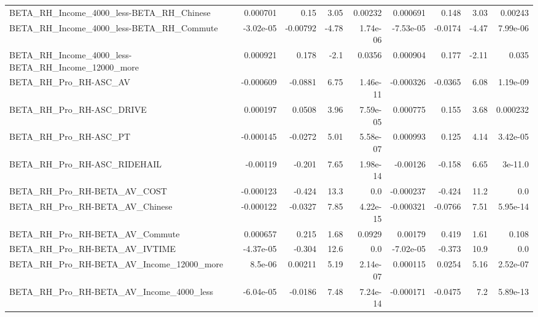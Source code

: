 \begin{tabular}{lrrrrrrrr}
BETA\_RH\_Income\_4000\_less-BETA\_RH\_Chinese           &    0.000701 &         0.15 &      3.05 &  0.00232 &   0.000691 &       0.148 &         3.03 &       0.00243 \\
BETA\_RH\_Income\_4000\_less-BETA\_RH\_Commute           &   -3.02e-05 &     -0.00792 &     -4.78 & 1.74e-06 &  -7.53e-05 &     -0.0174 &        -4.47 &      7.99e-06 \\
BETA\_RH\_Income\_4000\_less-BETA\_RH\_Income\_12000\_more &    0.000921 &        0.178 &      -2.1 &   0.0356 &   0.000904 &       0.177 &        -2.11 &         0.035 \\
BETA\_RH\_Pro\_RH-ASC\_AV                              &   -0.000609 &      -0.0881 &      6.75 & 1.46e-11 &  -0.000326 &     -0.0365 &         6.08 &      1.19e-09 \\
BETA\_RH\_Pro\_RH-ASC\_DRIVE                           &    0.000197 &       0.0508 &      3.96 & 7.59e-05 &   0.000775 &       0.155 &         3.68 &      0.000232 \\
BETA\_RH\_Pro\_RH-ASC\_PT                              &   -0.000145 &      -0.0272 &      5.01 & 5.58e-07 &   0.000993 &       0.125 &         4.14 &      3.42e-05 \\
BETA\_RH\_Pro\_RH-ASC\_RIDEHAIL                        &    -0.00119 &       -0.201 &      7.65 & 1.98e-14 &   -0.00126 &      -0.158 &         6.65 &       3e-11.0 \\
BETA\_RH\_Pro\_RH-BETA\_AV\_COST                        &   -0.000123 &       -0.424 &      13.3 &      0.0 &  -0.000237 &      -0.424 &         11.2 &           0.0 \\
BETA\_RH\_Pro\_RH-BETA\_AV\_Chinese                     &   -0.000122 &      -0.0327 &      7.85 & 4.22e-15 &  -0.000321 &     -0.0766 &         7.51 &      5.95e-14 \\
BETA\_RH\_Pro\_RH-BETA\_AV\_Commute                     &    0.000657 &        0.215 &      1.68 &   0.0929 &    0.00179 &       0.419 &         1.61 &         0.108 \\
BETA\_RH\_Pro\_RH-BETA\_AV\_IVTIME                      &   -4.37e-05 &       -0.304 &      12.6 &      0.0 &  -7.02e-05 &      -0.373 &         10.9 &           0.0 \\
BETA\_RH\_Pro\_RH-BETA\_AV\_Income\_12000\_more           &     8.5e-06 &      0.00211 &      5.19 & 2.14e-07 &   0.000115 &      0.0254 &         5.16 &      2.52e-07 \\
BETA\_RH\_Pro\_RH-BETA\_AV\_Income\_4000\_less            &   -6.04e-05 &      -0.0186 &      7.48 & 7.24e-14 &  -0.000171 &     -0.0475 &          7.2 &      5.89e-13 \\

\end{tabular}
